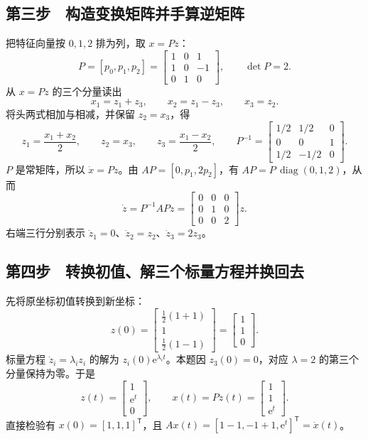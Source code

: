 \subsection{第三步　构造变换矩阵并手算逆矩阵}

把特征向量按 $0,1,2$ 排为列，取 $x=Pz$：
\[
 P=[p_0,p_1,p_2]=\begin{bmatrix}1&0&1\\1&0&-1\\0&1&0\end{bmatrix},
 \qquad \det P=2.
\]
从 $x=Pz$ 的三个分量读出
\[
 x_1=z_1+z_3,\qquad x_2=z_1-z_3,\qquad x_3=z_2.
\]
将头两式相加与相减，并保留 $z_2=x_3$，得
\[
 z_1=\frac{x_1+x_2}{2},\qquad
 z_2=x_3,\qquad
 z_3=\frac{x_1-x_2}{2},\qquad
 P^{-1}=\begin{bmatrix}1/2&1/2&0\\0&0&1\\1/2&-1/2&0\end{bmatrix}.
\]
$P$ 是常矩阵，所以 $\dot x=P\dot z$。由 $AP=[0,p_1,2p_2]$，有 $AP=P\,\operatorname{diag}(0,1,2)$，从而
\[
 \boxed{\dot z=P^{-1}APz=\begin{bmatrix}0&0&0\\0&1&0\\0&0&2\end{bmatrix}z.}
\]
右端三行分别表示 $\dot z_1=0$、$\dot z_2=z_2$、$\dot z_3=2z_3$。

\subsection{第四步　转换初值、解三个标量方程并换回去}

先将原坐标初值转换到新坐标：
\[
 z(0)=\begin{bmatrix}
 \frac12(1+1)\\1\\\frac12(1-1)
 \end{bmatrix}=\begin{bmatrix}1\\1\\0\end{bmatrix}.
\]
标量方程 $\dot z_i=\lambda_i z_i$ 的解为 $z_i(0)\mathrm e^{\lambda_i t}$。本题因 $z_3(0)=0$，对应 $\lambda=2$ 的第三个分量保持为零。于是
\[
 z(t)=\begin{bmatrix}1\\\mathrm e^t\\0\end{bmatrix},\qquad
 \boxed{x(t)=Pz(t)=\begin{bmatrix}1\\1\\\mathrm e^t\end{bmatrix}.}
\]
直接检验有 $x(0)=[1,1,1]^{\mathsf T}$，且 $Ax(t)=[1-1,-1+1,\mathrm e^t]^{\mathsf T}=\dot x(t)$。

